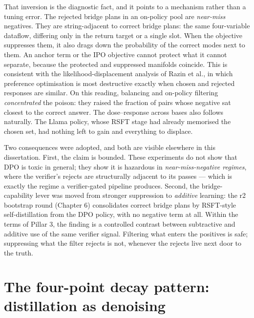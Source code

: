 That inversion is the diagnostic fact, and it points to a mechanism rather than a tuning error. The rejected bridge plans in an on-policy pool are \emph{near-miss} negatives. They are string-adjacent to correct bridge plans: the same four-variable dataflow, differing only in the return target or a single slot. When the objective suppresses them, it also drags down the probability of the correct modes next to them. An anchor term or the IPO objective cannot protect what it cannot separate, because the protected and suppressed manifolds coincide. This is consistent with the likelihood-displacement analysis of Razin et al., in which preference optimisation is most destructive exactly when chosen and rejected responses are similar. On this reading, balancing and on-policy filtering \emph{concentrated} the poison: they raised the fraction of pairs whose negative sat closest to the correct answer. The dose--response across bases also follows naturally. The Llama policy, whose RSFT stage had already memorised the chosen set, had nothing left to gain and everything to displace.

Two consequences were adopted, and both are visible elsewhere in this dissertation. First, the claim is bounded. These experiments do not show that DPO is toxic in general; they show it is hazardous in \emph{near-miss-negative regimes}, where the verifier's rejects are structurally adjacent to its passes --- which is exactly the regime a verifier-gated pipeline produces. Second, the bridge-capability lever was moved from stronger suppression to \emph{additive} learning: the r2 bootstrap round (Chapter 6) consolidates correct bridge plans by RSFT-style self-distillation from the DPO policy, with no negative term at all. Within the terms of Pillar 3, the finding is a controlled contrast between subtractive and additive use of the same verifier signal. Filtering what enters the positives is safe; suppressing what the filter rejects is not, whenever the rejects live next door to the truth.

\section{The four-point decay pattern: distillation as denoising}\label{sec:the-four-point-decay-pattern-distillatio}

